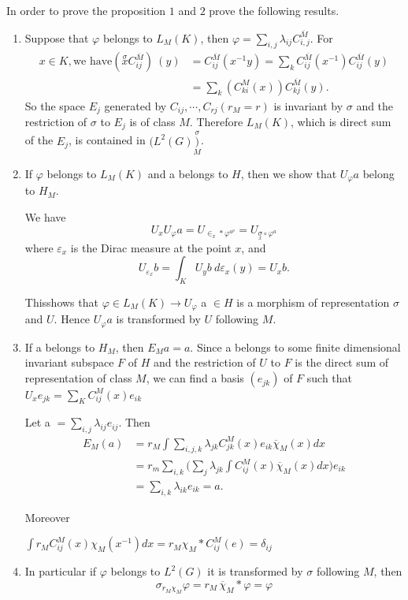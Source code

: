  In order to prove the proposition $1$ and $2$ prove the following results.
  \begin{enumerate}[(1)]
  \item Suppose that $\varphi$ belongs to $L_M(K)$, then $\varphi=
    \sum \limits_{i,j}\lambda_{ij}C^{\overline{M}}_{i,j} $. For  
    \begin{align*}
      x \in K, \text{we have} \left(\overset{\sigma}{x}
      C^{\overline{M}}_{ij}\right)~(y)&= C^{\overline{M}}_{ij}(x^{-1}y)= \sum
      _{k}C^{\overline{M}}_{ij}(x^{-1})C^{\overline{M}}_{ij}(y)\\ 
      &=\sum_{k}(C^M_{ki}(x))C^{\overline{M}}_{kj}(y).
    \end{align*}
    So the space $E_j$ generated by $C_{ij},\cdots, C_{rj}(r_M=r)$ is
    invariant by $\sigma$ and the restriction of $\sigma$ to $E_j$ is of
    class $M$. Therefore $L_M(K)$, which is direct sum of the $E_j$, is
    contained in $(L^2(G) \overset \sigma {\underset {M})}$.  

  \item If $\varphi$ belongs to $L_M (K)$ and a belongs to $H$, then
    we show that $U_\varphi a$ belong to $H_M$. 

    We have 
    $$
    U_x U_\varphi a=U_{\in _x * \varphi ^{a^p}}=U_{\underset {x}\sigma
      \circ\varphi^a}
    $$ 
    where $\varepsilon_x$ is the Dirac measure at the point $x$, and 
    $$
    U_{\varepsilon_x}b=\int_{K}  U_y b ~d\varepsilon_x (y)=U_x b.
    $$

    This\pageoriginale shows that $\varphi \in L_M(K) \to U_\varphi$ a $\in H$ is a
    morphism of representation $\sigma$ and $U$. Hence $U_\varphi a$
    is transformed by $U$ following $M$.

\item If a belongs to $H_M$, then $E_M a=a$. Since a belongs to some
  finite dimensional invariant subspace $F$ of $H$ and the restriction
  of $U$ to $F$ is the direct sum of representation of class $M$, we
  can find a basis $(e_{jk})$  of $F$ such that $U_x e_{jk}=\sum
  \limits_K C^M_{ij}(x)e_{ik}$ 

  Let a $= \sum \limits _{i,j}\lambda_{ij}e_{ij}$. Then 
  \begin{align*}
    E_M (a)&=r_M \int \sum_{i,j,k} \lambda_{jk} C^M_{jk}(x)e_{ik}
    \overline {\chi}_M(x)dx\\ 
    &=r_m \sum _{i,k} \bigg (\sum _{j}\lambda_{jk} \int C^M_{ij}(x)
    \overline{\chi}_M (x)dx \bigg ) e_{ik} \\ 
    &=\sum _{i,k}\lambda_{ik}e_{ik}=a.
  \end{align*}
  
  Moreover
  
  $\int r_M C^M_{ij}(x)\chi_M (x^{-1})dx = r_M \chi_M* C^M_{ij}(e)=\delta_{ij}$
  
\item In particular if $\varphi$ belongs to $L^2(G)$ it is transformed
  by $\sigma$ following $M$, then 
  $$
  \sigma_{r_M \chi _M} \varphi=r_M \,\overline{\chi}_M *\varphi=\varphi
  $$
\end{enumerate} 
  

